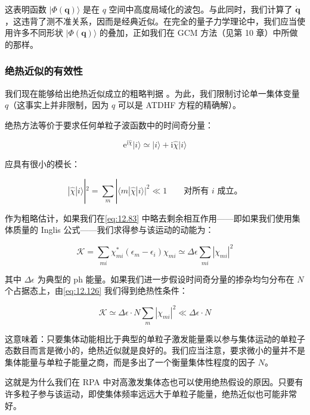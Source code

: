 这表明函数 $|\Phi(\boldsymbol{q})\rangle$ 是在 $q$ 空间中高度局域化的波包。与此同时，我们计算了
$\dot{\boldsymbol{q}}$，这违背了测不准关系，因而是经典近似。在完全的量子力学理论中，我们应当使用许多不同形状
$|\Phi(\boldsymbol{q})\rangle$ 的叠加，正如我们在 GCM 方法（见第 10 章）中所做的那样。

\subsubsection{绝热近似的有效性}

我们现在能够给出绝热近似成立的粗略判据 \cite{BV78}。为此，我们限制讨论单一集体变量 $q$（这事实上并非限制，因为
$q$ 可以是 ATDHF 方程的精确解）。

绝热方法等价于要求任何单粒子波函数中的时间奇分量：

\begin{equation}
\mathrm{e}^{\mathrm{i}\hat{\chi}}|i\rangle\simeq|i\rangle+\mathrm{i}\hat{\chi}|i\rangle\label{eq:12.125}
\end{equation}

应具有很小的模长：

\begin{equation}
|\hat{\chi}|i\rangle|^{2}=\sum_{m}|\langle m|\hat{\chi}|i\rangle|^{2}\ll1\qquad\text{对所有 }i\text{ 成立。}\label{eq:12.125b}
\end{equation}

作为粗略估计，如果我们在\ref{eq:12.83} 中略去剩余相互作用——即如果我们使用集体质量的 Inglis 公式——我们求得参与该运动的动能为：

\begin{equation}
\mathcal{K}=\sum_{mi}\chi^{*}_{mi}(\epsilon_{m}-\epsilon_{i})\chi_{mi}\simeq\Delta\epsilon\sum_{mi}|\chi_{mi}|^{2}\label{eq:12.126}
\end{equation}

其中 $\Delta\epsilon$ 为典型的 ph 能量。如果我们进一步假设时间奇分量的掺杂均匀分布在 $N$ 个占据态上，由\ref{eq:12.126}
我们得到绝热性条件：

\begin{equation}
\mathcal{K}\simeq\Delta\epsilon\cdot N\sum_{m}|\chi_{mi}|^{2}\ll\Delta\epsilon\cdot N\label{eq:12.127}
\end{equation}

这意味着：只要集体动能相比于典型的单粒子激发能量乘以参与集体运动的单粒子态数目而言是微小的，绝热近似就是良好的。我们应当注意，要求微小的量并不是集体能量与单粒子能量之商，而是多出了一个衡量集体性程度的因子
$N$。

这就是为什么我们在 RPA 中对高激发集体态也可以使用绝热假设的原因。只要有许多粒子参与该运动，即使集体频率远远大于单粒子能量，绝热近似也可能非常好。

